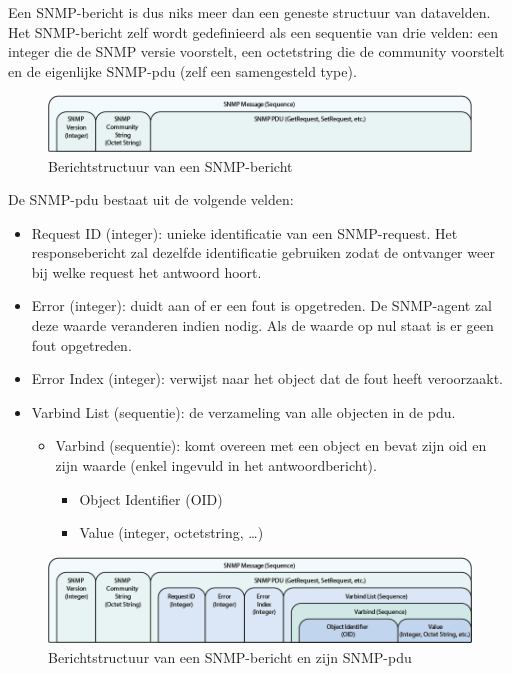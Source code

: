 Een SNMP-bericht is dus niks meer dan een geneste structuur van datavelden.
Het SNMP-bericht zelf wordt gedefinieerd als een sequentie van drie velden: een integer die de SNMP versie voorstelt, een octetstring die de community voorstelt en
de eigenlijke SNMP-\gls{pdu} (zelf een samengesteld type).

\begin{figure}[h]
	\centering
	\includegraphics[scale=0.45]{figures/snmp/berichtstructuur-1}
	\caption{Berichtstructuur van een SNMP-bericht}
	\label{fig-berichtstructuur-1}
\end{figure}

De SNMP-\gls{pdu} bestaat uit de volgende velden:

\begin{itemize}
	\item Request ID (integer): unieke identificatie van een SNMP-request.
		Het responsebericht zal dezelfde identificatie gebruiken zodat de ontvanger weer bij welke request het antwoord hoort.
	\item Error (integer): duidt aan of er een fout is opgetreden.
		De SNMP-agent zal deze waarde veranderen indien nodig. Als de waarde op nul staat is er geen fout opgetreden.
	\item Error Index (integer): verwijst naar het object dat de fout heeft veroorzaakt.
	\item Varbind List (sequentie): de verzameling van alle objecten in de \gls{pdu}.
		\begin{itemize}
			\item Varbind (sequentie): komt overeen met een object en bevat zijn \gls{oid} en zijn waarde (enkel ingevuld in het antwoordbericht).
				\begin{itemize}
					\item Object Identifier (OID)
					\item Value (integer, octetstring, \ldots)
				\end{itemize}
		\end{itemize}
\end{itemize}

\begin{figure}[h]
	\centering
	\includegraphics[scale=0.45]{figures/snmp/berichtstructuur-2}
	\caption{Berichtstructuur van een SNMP-bericht en zijn SNMP-\gls{pdu}}
	\label{fig-berichtstructuur-2}
\end{figure}


